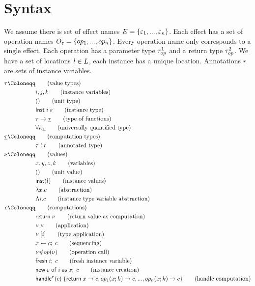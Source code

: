 \section{Syntax}
We assume there is set of effect names $E = \{ \varepsilon_1, ..., \varepsilon_n \}$.
Each effect has a set of operation names $O_\varepsilon = \{ op_1, ..., op_n \}$.
Every operation name only corresponds to a single effect.
Each operation has a parameter type $\tau^1_{op}$ and a return type $\tau^2_{op}$.
We have a set of locations $l \in L$, each instance has a unique location.
Annotations $r$ are sets of instance variables.
\\
\begin{align*}
	\ty \Coloneqq 	& 																	\tag{value types} \\
									& i, j, k														\tag{instance variables} \\
									& \tunit														\tag{unit type} \\
									& \tinst{i}{\eff}										\tag{instance type} \\
									& \tarr{\ty}{\cty}									\tag{type of functions} \\
									& \tforall{i}{\cty}									\tag{universally quantified type}\\
	\cty \Coloneqq 	& 																	\tag{computation types} \\
									& \aty{\ty}{r}											\tag{annotated type} \\
	\val \Coloneqq	&																		\tag{values} \\
									& x, y, z, k												\tag{variables} \\
									& \vunit														\tag{unit value} \\
									& \vinst{\loc}											\tag{instance values} \\
									& \vabs{x}{\comp}										\tag{abstraction} \\
									& \vabst{i}{\comp}									\tag{instance type variable abstraction} \\
	\comp \Coloneqq	&																		\tag{computations} \\
									& \creturn{\val}										\tag{return value as computation} \\
									& \capp{\val}{\val}									\tag{application} \\
									& \cappt{\val}{i}										\tag{type application} \\
									& \cdo{x}{\comp}{\comp}							\tag{sequencing} \\
									& \cop{\val}{\op}{\val}							\tag{operation call} \\
									& \cfresh{i}{\comp}									\tag{fresh instance variable} \\
									& \cnew{\eff}{i}{x}{\comp}					\tag{instance creation} \\
									& \chandlec{\val}{\comp}						\tag{handle computation} \\
\end{align*}

